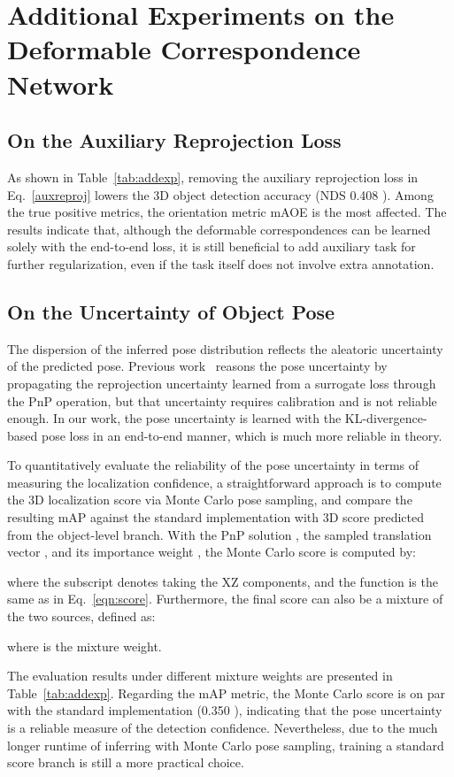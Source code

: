 \documentclass[10pt,twocolumn,letterpaper]{article}
\begin{document}
\section{Additional Experiments on the Deformable Correspondence Network}

\subsection{On the Auxiliary Reprojection Loss}
As shown in Table~\ref{tab:addexp}, removing the auxiliary reprojection loss in Eq.~\ref{auxreproj} lowers the 3D object detection accuracy (NDS 0.408 ). Among the true positive metrics, the orientation metric mAOE is the most affected. The results indicate that, although the deformable correspondences can be learned solely with the end-to-end loss, it is still beneficial to add auxiliary task for further regularization, even if the task itself does not involve extra annotation.

\subsection{On the Uncertainty of Object Pose}
\label{uncertainpose}
The dispersion of the inferred pose distribution reflects the aleatoric uncertainty of the predicted pose. Previous work~\cite{monorun} reasons the pose uncertainty by propagating the reprojection uncertainty learned from a surrogate loss through the PnP operation, but that uncertainty requires calibration and is not reliable enough. In our work, the pose uncertainty is learned with the KL-divergence-based pose loss in an end-to-end manner, which is much more reliable in theory. 

To quantitatively evaluate the reliability of the pose uncertainty in terms of measuring the localization confidence, a straightforward approach is to compute the 3D localization score  via Monte Carlo pose sampling, and compare the resulting mAP against the standard implementation with 3D score  predicted from the object-level branch. With the PnP solution , the sampled translation vector , and its importance weight , the Monte Carlo score is computed by:

where the subscript  denotes taking the XZ components, and the function  is the same as in Eq.~\ref{eqn:score}. Furthermore, the final score can also be a mixture of the two sources, defined as:

where  is the mixture weight.

The evaluation results under different mixture weights are presented in Table~\ref{tab:addexp}. Regarding the mAP metric, the Monte Carlo score is on par with the standard implementation (0.350  ), indicating that the pose uncertainty is a reliable measure of the detection confidence. Nevertheless, due to the much longer runtime of inferring with Monte Carlo pose sampling, training a standard score branch is still a more practical choice.
\end{document}
